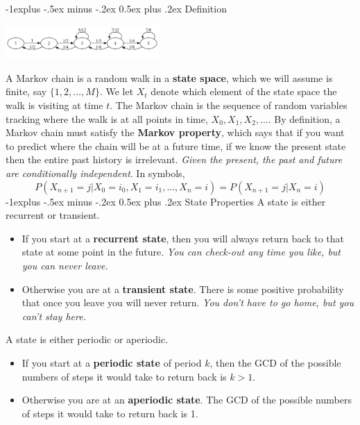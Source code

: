 \documentclass[10pt,landscape]{article}
\makeatletter
\renewcommand{\subsection}{\@startsection{subsection}{2}{0mm}%
                                {-1explus -.5ex minus -.2ex}%
                                {0.5ex plus .2ex}%
                                {\normalfont\normalsize\bfseries}}
\makeatother
\begin{document}
\begin{multicols*}{3}
\subsection{Definition}
\begin{minipage}{\linewidth}
            \centering
\includegraphics[width=2.3in]{figures/chainA.pdf}
        \end{minipage}
A Markov chain is a random walk in a \textbf{state space}, which we will assume is finite, say $\{1, 2, \dots, M\}$. We let $X_t$ denote which element of the state space the walk is visiting at time $t$. The Markov chain is the sequence of random variables tracking where the walk is at all points in time, $X_0, X_1, X_2, \dots$. By definition, a Markov chain must satisfy the \textbf{Markov property}, which says that if you want to predict where the chain will be at a future time, if we know the present state then the entire past history is irrelevant.  \emph{Given the present, the past and future are conditionally independent}. In symbols,
\[P(X_{n+1} = j | X_0 = i_0, X_1 = i_1, \dots, X_n = i) = P(X_{n+1} = j | X_n = i)\]
\subsection{State Properties}
A state is either recurrent or transient.
\begin{itemize}
\item If you start at a \textbf{recurrent state}, then you will always return back to that state at some point in the future.  \textmusicalnote \emph{You can check-out any time you like, but you can never leave.}  \textmusicalnote
\item Otherwise you are at a \textbf{transient state}. There is some positive probability that once you leave you will never return. \textmusicalnote \emph{You don't have to go home, but you can't stay here.} \textmusicalnote
\end{itemize}
A state is either periodic or aperiodic.
\begin{itemize}
\item If you start at a \textbf{periodic state} of period $k$, then the GCD of  the possible numbers of steps it would take to return back is  $k>1$.
\item Otherwise you are at an \textbf{aperiodic state}. The GCD of  the possible numbers of steps it would take to return back is 1.
\end{itemize}



\end{multicols*}
\end{document}
